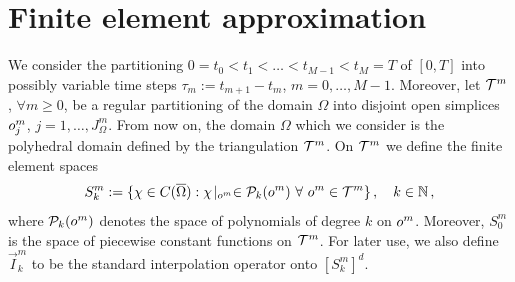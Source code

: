 \section{Finite element approximation}\label{sec:stokes_fem}
We consider the partitioning  $0= t_0 < t_1 < \ldots < t_{M-1} < t_M = T$ of
$[0,T]$ into possibly variable time steps $\tau_m := t_{m+1}-t_m$, $m=0
,\ldots, M-1$. Moreover, let ${\cal T}^m$, $\forall m\ge 0$, be a regular
partitioning of the domain $\Omega$ into disjoint open simplices
$o^m_j$, $j = 1 ,\ldots, J^m_\Omega$. From now on, the domain $\Omega$
which we consider is the polyhedral domain defined by the triangulation ${\cal
T}^m$. On ${\cal T}^m$ we define the finite element spaces
\begin{equation*}
S^m_k := \{\chi \in C(\overline{\Omega}) : \chi\!\mid_{o^m}
\in \mathcal{P}_k(o^m) \ \forall\ o^m \in {\cal T}^m\}\,,
\quad k \in \mathbb{N}\,,
\end{equation*}
where $\mathcal{P}_k(o^m)$ denotes the space of polynomials of degree $k$
on $o^m$. Moreover, $S^m_0$ is the space of piecewise constant functions
on ${\cal T}^m$. For later use, we also define $\vec I^m_k$ to be the standard
interpolation operator onto $[S^m_k]^d$.

